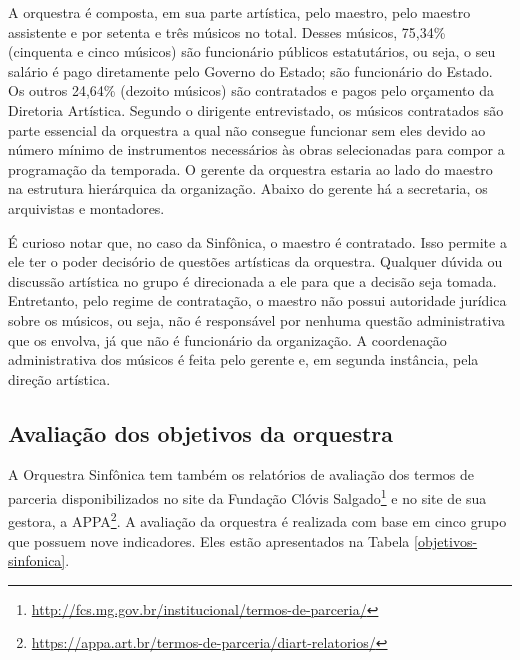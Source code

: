 \documentclass[a4paper, 12pt, openright, oneside, german, french, english, brazil]{abntex2}
\begin{document}
	A orquestra é composta, em sua parte artística, pelo maestro, pelo maestro assistente e por setenta e três músicos no total. Desses músicos, 75,34\% (cinquenta e cinco músicos) são funcionário públicos estatutários, ou seja, o seu salário é pago diretamente pelo Governo do Estado; são funcionário do Estado. Os outros 24,64\% (dezoito músicos) são contratados e pagos pelo orçamento da Diretoria Artística. Segundo o dirigente entrevistado, os músicos contratados são parte essencial da orquestra a qual não consegue funcionar sem eles devido ao número mínimo de instrumentos necessários às obras selecionadas para compor a programação da temporada. O gerente da orquestra estaria ao lado do maestro na estrutura hierárquica da organização. Abaixo do gerente há a secretaria, os arquivistas e montadores.
	
	É curioso notar que, no caso da Sinfônica, o maestro é contratado. Isso permite a ele ter o poder decisório de questões artísticas da orquestra. Qualquer dúvida ou discussão artística no grupo é direcionada a ele para que a decisão seja tomada. Entretanto, pelo regime de contratação, o maestro não possui autoridade jurídica sobre os músicos, ou seja, não é responsável por nenhuma questão administrativa que os envolva, já que não é funcionário da organização. A coordenação administrativa dos músicos é feita pelo gerente e, em segunda instância, pela direção artística.
	

	\subsection{Avaliação dos objetivos da orquestra}
	
	A Orquestra Sinfônica tem também os relatórios de avaliação dos termos de parceria disponibilizados no site da Fundação Clóvis Salgado\footnote{\url{http://fcs.mg.gov.br/institucional/termos-de-parceria/}} e no site de sua gestora, a APPA\footnote{\url{https://appa.art.br/termos-de-parceria/diart-relatorios/}}. A avaliação da orquestra é realizada com base em cinco grupo que possuem nove indicadores. Eles estão apresentados na Tabela \ref{objetivos-sinfonica}.
	
\end{document}
